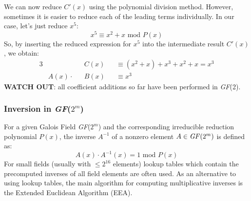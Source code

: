 \documentclass[11pt, a4paper]{article}
\newcommand{\gf}[1]{\textit{GF}(#1)}
\newcommand{\mymod}{
    \text{ mod }
}
\begin{document}
We can now reduce $C'(x)$ using the polynomial division method. However, sometimes it is easier to reduce each of the leading terms individually. In our case, let's just reduce $x^5$:
$$x^5\equiv x^2+x\mymod P(x)$$
So, by inserting the reduced expression for $x^5$ into the intermediate result $C'(x)$, we obtain:
\begin{alignat*}{3}
    &         &&C(x)&&\equiv(x^2+x)+x^3+x^2+x=x^3\\
    &A(x)\cdot&&B(x)&&\equiv x^3
\end{alignat*}
\textbf{WATCH OUT}: all coefficient additions so far have been performed in \gf{2}.

\newpage
\subsubsection{Inversion in \gf{$2^m$}}
For a given Galois Field \gf{$2^m$} and the corresponding irreducible reduction polynomial $P(x)$, the inverse $A^{-1}$ of a nonzero element $A\in\text{\gf{$2^m$}}$ is defined as:
$$A(x)\cdot A^{-1}(x)=1\mymod P(x)$$
For small fields (usually with $\le2^{16}$ elements) lookup tables which contain the precomputed inverses of all field elements are often used. As an alternative to using lookup tables, the main algorithm for computing multiplicative inverses is the Extended Euclidean Algorithm (EEA).
\end{document}

